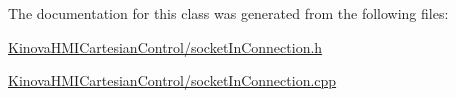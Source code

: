 The documentation for this class was generated from the following files\+:\begin{DoxyCompactItemize}
\item 
\hyperlink{KinovaHMICartesianControl_2socketInConnection_8h}{Kinova\+H\+M\+I\+Cartesian\+Control/socket\+In\+Connection.\+h}\item 
\hyperlink{KinovaHMICartesianControl_2socketInConnection_8cpp}{Kinova\+H\+M\+I\+Cartesian\+Control/socket\+In\+Connection.\+cpp}\end{DoxyCompactItemize}
